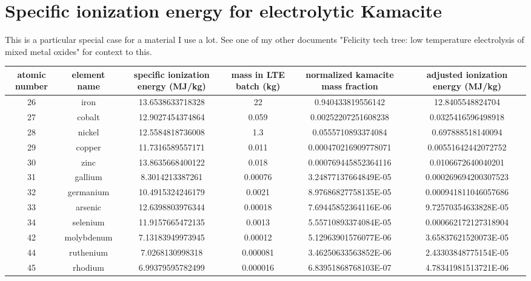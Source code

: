 \documentclass[a4paper]{article}
\begin{document}
	\pagebreak
	
	\section{Specific ionization energy for electrolytic Kamacite}
	
	This is a particular special case for a material I use a lot.
	See one of my other documents "Felicity tech tree: low temperature electrolysis of mixed metal oxides" for context to this.
	
	\tiny
	
	\begin{center}
		\begin{tabular}{|c|c|c|c|c|c|}
			\hline
			atomic number & element name & specific ionization energy (MJ/kg) & mass in LTE batch (kg) & normalized kamacite mass fraction & adjusted ionization energy (MJ/kg) \\
			\hline
			26 & iron & 13.6538633718328 & 22 & 0.940433819556142 & 12.8405548824704 \\
			\hline
			27 & cobalt & 12.9027454374864 & 0.059 & 0.00252207251608238 & 0.0325416596498918 \\
			\hline
			28 & nickel & 12.5584818736008 & 1.3 & 0.0555710893374084 & 0.697888518140094 \\
			\hline
			29 & copper & 11.7316589557171 & 0.011 & 0.000470216909778071 & 0.00551642442072752 \\
			\hline
			30 & zinc & 13.8635668400122 & 0.018 & 0.000769445852364116 & 0.0106672640040201 \\
			\hline
			31 & gallium & 8.3014213387261 & 0.00076 & 3.24877137664849E-05 & 0.000269694200307523 \\
			\hline
			32 & germanium & 10.4915324246179 & 0.0021 & 8.97686827758135E-05 & 0.000941811046057686 \\
			\hline
			33 & arsenic & 12.6398803976344 & 0.00018 & 7.69445852364116E-06 & 9.72570354633828E-05 \\
			\hline
			34 & selenium & 11.9157665472135 & 0.0013 & 5.55710893374084E-05 & 0.000662172127318904 \\
			\hline
			42 & molybdenum & 7.13183949973945 & 0.00012 & 5.12963901576077E-06 & 3.65837621520073E-05 \\
			\hline
			44 & ruthenium & 7.0268130998318 & 0.000081 & 3.46250633563852E-06 & 2.43303848775154E-05 \\
			\hline
			45 & rhodium & 6.99379595782499 & 0.000016 & 6.83951868768103E-07 & 4.78341981513721E-06 \\

\end{tabular}
\end{center}
\end{document}
